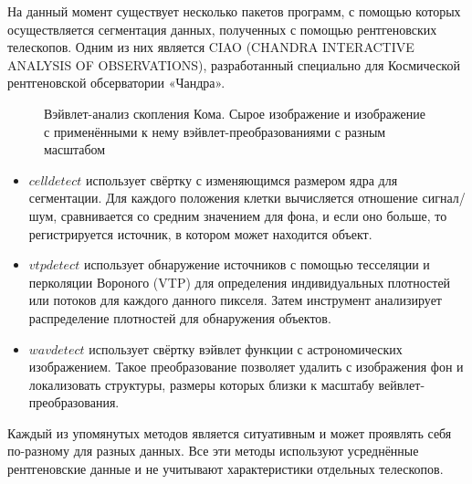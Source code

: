 На данный момент существует несколько пакетов программ, с помощью которых осуществляется 
сегментация данных, полученных с помощью рентгеновских телескопов. Одним из них является CIAO 
(CHANDRA INTERACTIVE ANALYSIS OF OBSERVATIONS), разработанный специально для Космической 
рентгеновской обсерватории «Чандра». \\

\begin{figure}[h]
    \caption{Вэйвлет-анализ скопления Кома. Сырое изображение и изображение с применёнными 
        к нему вэйвлет-преобразованиями с разным масштабом \cite{Vikhlinin}}
\end{figure}

\begin{itemize}
    \item $celldetect$ использует свёртку с изменяющимся размером ядра для сегментации. Для каждого
        положения клетки вычисляется отношение сигнал/шум, сравнивается со средним значением для 
        фона, и если оно больше, то регистрируется источник, в котором может находится объект.
    \item $vtpdetect$ использует обнаружение источников с помощью тесселяции и перколяции Вороного 
        (VTP) для определения индивидуальных плотностей или потоков для каждого данного пикселя. 
        Затем инструмент анализирует распределение плотностей для обнаружения объектов.
    \item $wavdetect$ использует свёртку вэйвлет функции с астрономических изображением. Такое 
		преобразование позволяет удалить с изображения фон и локализовать структуры, размеры 
		которых близки к масштабу вейвлет-преобразования.
\end{itemize}

Каждый из упомянутых методов является ситуативным и может проявлять себя по-разному для разных 
данных. Все эти методы используют усреднённые рентгеновские данные и не учитывают характеристики 
отдельных телескопов.\\

